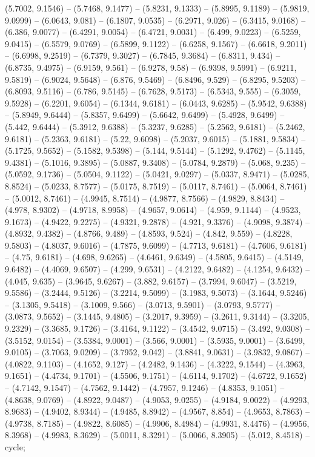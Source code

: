 (5.7002, 9.1546) -- (5.7468, 9.1477) -- (5.8231, 9.1333) -- (5.8995, 9.1189) -- (5.9819, 9.0999) -- (6.0643, 9.081) -- (6.1807, 9.0535) -- (6.2971, 9.026) -- (6.3415, 9.0168) -- (6.386, 9.0077) -- (6.4291, 9.0054) -- (6.4721, 9.0031) -- (6.499, 9.0223) -- (6.5259, 9.0415) -- (6.5579, 9.0769) -- (6.5899, 9.1122) -- (6.6258, 9.1567) -- (6.6618, 9.2011) -- (6.6998, 9.2519) -- (6.7379, 9.3027) -- (6.7845, 9.3684) -- (6.8311, 9.434) -- (6.8735, 9.4975) -- (6.9159, 9.561) -- (6.9278, 9.58) -- (6.9398, 9.5991) -- (6.9211, 9.5819) -- (6.9024, 9.5648) -- (6.876, 9.5469) -- (6.8496, 9.529) -- (6.8295, 9.5203) -- (6.8093, 9.5116) -- (6.786, 9.5145) -- (6.7628, 9.5173) -- (6.5343, 9.555) -- (6.3059, 9.5928) -- (6.2201, 9.6054) -- (6.1344, 9.6181) -- (6.0443, 9.6285) -- (5.9542, 9.6388) -- (5.8949, 9.6444) -- (5.8357, 9.6499) -- (5.6642, 9.6499) -- (5.4928, 9.6499) -- (5.442, 9.6444) -- (5.3912, 9.6388) -- (5.3237, 9.6285) -- (5.2562, 9.6181) -- (5.2462, 9.6181) -- (5.2363, 9.6181) -- (5.22, 9.6098) -- (5.2037, 9.6015) -- (5.1881, 9.5834) -- (5.1725, 9.5652) -- (5.1582, 9.5398) -- (5.144, 9.5144) -- (5.1292, 9.4762) -- (5.1145, 9.4381) -- (5.1016, 9.3895) -- (5.0887, 9.3408) -- (5.0784, 9.2879) -- (5.068, 9.235) -- (5.0592, 9.1736) -- (5.0504, 9.1122) -- (5.0421, 9.0297) -- (5.0337, 8.9471) -- (5.0285, 8.8524) -- (5.0233, 8.7577) -- (5.0175, 8.7519) -- (5.0117, 8.7461) -- (5.0064, 8.7461) -- (5.0012, 8.7461) -- (4.9945, 8.7514) -- (4.9877, 8.7566) -- (4.9829, 8.8434) -- (4.978, 8.9302) -- (4.9718, 8.9958) -- (4.9657, 9.0614) -- (4.959, 9.1144) -- (4.9523, 9.1673) -- (4.9422, 9.2275) -- (4.9321, 9.2878) -- (4.921, 9.3376) -- (4.9098, 9.3874) -- (4.8932, 9.4382) -- (4.8766, 9.489) -- (4.8593, 9.524) -- (4.842, 9.559) -- (4.8228, 9.5803) -- (4.8037, 9.6016) -- (4.7875, 9.6099) -- (4.7713, 9.6181) -- (4.7606, 9.6181) -- (4.75, 9.6181) -- (4.698, 9.6265) -- (4.6461, 9.6349) -- (4.5805, 9.6415) -- (4.5149, 9.6482) -- (4.4069, 9.6507) -- (4.299, 9.6531) -- (4.2122, 9.6482) -- (4.1254, 9.6432) -- (4.045, 9.635) -- (3.9645, 9.6267) -- (3.882, 9.6157) -- (3.7994, 9.6047) -- (3.5219, 9.5586) -- (3.2444, 9.5126) -- (3.2214, 9.5099) -- (3.1983, 9.5073) -- (3.1644, 9.5246) -- (3.1305, 9.5418) -- (3.1009, 9.566) -- (3.0713, 9.5901) -- (3.0793, 9.5777) -- (3.0873, 9.5652) -- (3.1445, 9.4805) -- (3.2017, 9.3959) -- (3.2611, 9.3144) -- (3.3205, 9.2329) -- (3.3685, 9.1726) -- (3.4164, 9.1122) -- (3.4542, 9.0715) -- (3.492, 9.0308) -- (3.5152, 9.0154) -- (3.5384, 9.0001) -- (3.566, 9.0001) -- (3.5935, 9.0001) -- (3.6499, 9.0105) -- (3.7063, 9.0209) -- (3.7952, 9.042) -- (3.8841, 9.0631) -- (3.9832, 9.0867) -- (4.0822, 9.1103) -- (4.1652, 9.127) -- (4.2482, 9.1436) -- (4.3222, 9.1544) -- (4.3963, 9.1651) -- (4.4734, 9.1701) -- (4.5506, 9.1751) -- (4.6114, 9.1702) -- (4.6722, 9.1652) -- (4.7142, 9.1547) -- (4.7562, 9.1442) -- (4.7957, 9.1246) -- (4.8353, 9.1051) -- (4.8638, 9.0769) -- (4.8922, 9.0487) -- (4.9053, 9.0255) -- (4.9184, 9.0022) -- (4.9293, 8.9683) -- (4.9402, 8.9344) -- (4.9485, 8.8942) -- (4.9567, 8.854) -- (4.9653, 8.7863) -- (4.9738, 8.7185) -- (4.9822, 8.6085) -- (4.9906, 8.4984) -- (4.9931, 8.4476) -- (4.9956, 8.3968) -- (4.9983, 8.3629) -- (5.0011, 8.3291) -- (5.0066, 8.3905) -- (5.012, 8.4518) -- cycle;




